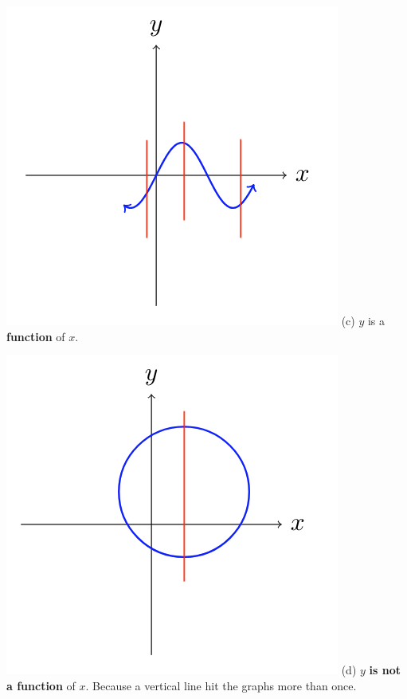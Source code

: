 %
\noindent\begin{minipage}{0.4\textwidth}%
\includegraphics[width=\linewidth]{Pics/3_line.png}
(c) $y$ is a \textbf{function} of $x$.
\end{minipage}%
\hfill%
\begin{minipage}{0.4\textwidth}
\includegraphics[width=\linewidth]{Pics/4_line.png}
(d) $y$ \textbf{is not a function} of $x$. Because a vertical line hit the graphs more than once.
\end{minipage}
%
